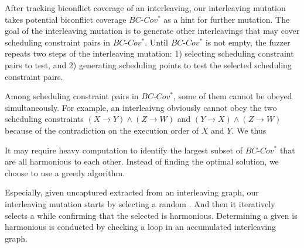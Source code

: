 


After tracking biconflict coverage of an interleaving, our
interleaving mutation takes potential biconflict coverage
$BC\mbox{-}Cov^*$ as a hint for further mutation.
%
The goal of the interleaving mutation is to generate other
interleavings that may cover scheduling constraint pairs in
$BC\mbox{-}Cov^*$.
%
Until $BC\mbox{-}Cov^*$ is not empty, the fuzzer repeats two steps of
the interleaving mutation:
%
1) selecting scheduling constraint pairs to test, and
2) generating scheduling points to test the selected scheduling
constraint pairs.


%
Among scheduling constraint pairs in $BC\mbox{-}Cov^*$, some of them
cannot be obeyed simultaneously.
%
For example, an interleaivng obviously cannot obey the two scheduling
constraints $(X \rightarrow Y)\wedge (Z \rightarrow W)$ and
$(Y \rightarrow X)\wedge (Z \rightarrow W)$ because of the
contradiction on the execution order of $X$ and $Y$.
%
We thus 


It may require heavy computation to identify the largest subset of
$BC\mbox{-}Cov^*$ that are all harmonious to each other.
%
Instead of finding the optimal solution, we choose to use a greedy
algorithm.
%


Especially, given uncaptured \segments extracted from an interleaving
graph, our interleaving mutation starts by selecting a random
\segment.
%
And then it iteratively selects a \segment while confirming that the
selected \segment is harmonious.
%
Determining a given \segment is harmonious is conducted by checking a
loop in an accumulated interleaving graph.



